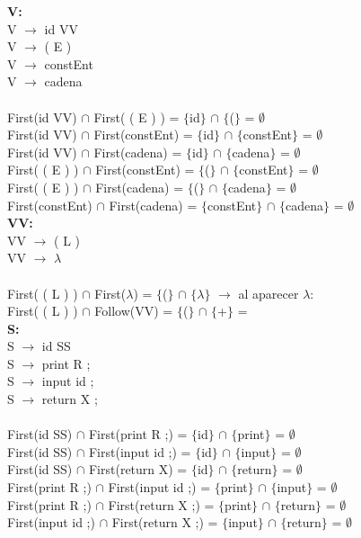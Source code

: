 \documentclass{article}[a4paper]
\newcommand\tab[1][1cm]{\hspace*{#1}}
\begin{document}
\textbf{V:}\\
\tab V $\rightarrow$ id VV\\
\tab V $\rightarrow$ ( E )\\
\tab V $\rightarrow$ constEnt\\
\tab V $\rightarrow$ cadena\\ \\
\tab \tab First(id VV) $\cap$ First( ( E ) ) = $\lbrace$id$\rbrace$ $\cap$ $\lbrace$($\rbrace$ = $\emptyset$\\
\tab \tab First(id VV) $\cap$ First(constEnt) = $\lbrace$id$\rbrace$ $\cap$ $\lbrace$constEnt$\rbrace$ = $\emptyset$\\
\tab \tab First(id VV) $\cap$ First(cadena) = $\lbrace$id$\rbrace$ $\cap$ $\lbrace$cadena$\rbrace$ = $\emptyset$\\
\tab \tab First( ( E ) ) $\cap$ First(constEnt) = $\lbrace$($\rbrace$ $\cap$ $\lbrace$constEnt$\rbrace$ = $\emptyset$\\
\tab \tab First( ( E ) ) $\cap$ First(cadena) = $\lbrace$($\rbrace$ $\cap$ $\lbrace$cadena$\rbrace$ = $\emptyset$\\
\tab \tab First(constEnt) $\cap$ First(cadena) = $\lbrace$constEnt$\rbrace$ $\cap$ $\lbrace$cadena$\rbrace$ = $\emptyset$\\

\textbf{VV:}\\
\tab VV $\rightarrow$ ( L )\\
\tab VV $\rightarrow$ $\lambda$\\ \\
\tab \tab First( ( L ) ) $\cap$ First($\lambda$) = $\lbrace$($\rbrace$ $\cap$ $\lbrace$$\lambda$$\rbrace$ $\rightarrow$ al aparecer $\lambda$:\\
\tab \tab First( ( L ) ) $\cap$  Follow(VV) = $\lbrace$($\rbrace$ $\cap$ $\lbrace$+$\rbrace$ = \emptyset \\

\textbf{S:}\\
\tab S $\rightarrow$ id SS\\
\tab S $\rightarrow$ print R ;\\
\tab S $\rightarrow$ input id ;\\
\tab S $\rightarrow$ return X ;\\ \\
\tab \tab First(id SS) $\cap$ First(print R ;) = $\lbrace$id$\rbrace$ $\cap$ $\lbrace$print$\rbrace$ = $\emptyset$\\
\tab \tab First(id SS) $\cap$ First(input id ;) = $\lbrace$id$\rbrace$ $\cap$ $\lbrace$input$\rbrace$ = $\emptyset$\\
\tab \tab First(id SS) $\cap$ First(return X) = $\lbrace$id$\rbrace$ $\cap$ $\lbrace$return$\rbrace$ = $\emptyset$\\
\tab \tab First(print R ;) $\cap$ First(input id ;) = $\lbrace$print$\rbrace$ $\cap$ $\lbrace$input$\rbrace$ = $\emptyset$\\
\tab \tab First(print R ;) $\cap$ First(return X ;) = $\lbrace$print$\rbrace$ $\cap$ $\lbrace$return$\rbrace$ = $\emptyset$\\
\tab \tab First(input id ;) $\cap$ First(return X ;) = $\lbrace$input$\rbrace$ $\cap$ $\lbrace$return$\rbrace$ = $\emptyset$\\
\end{document}

